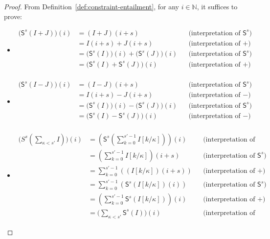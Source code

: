 \begin{proof}
From Definition~\ref{def:constraint-entailment}, for any $i \in \mathbb{N}$, it suffices to prove:
\begin{itemize}
  \item[(1)]
  \begin{align*}
    \bigl(\mathsf{S}^s(I+J)\bigr)(i)
    &= (I+J)(i+s)&& \text{(interpretation of $\mathsf{S}^{s}$)}\\
    &= I(i+s)+J(i+s)&& \text{(interpretation of $+$)}\\
    &= \bigl(\mathsf{S}^s(I)\bigr)(i)
       +\bigl(\mathsf{S}^s(J)\bigr)(i)&& \text{(interpretation of $\mathsf{S}^{s}$)}\\
    &= \bigl(\mathsf{S}^s(I)+\mathsf{S}^s(J)\bigr)(i) && \text{(interpretation of $+$)}\\
  \end{align*}

  \item[(2)]
  \begin{align*}
    \bigl(\mathsf{S}^s(I-J)\bigr)(i)
    &= (I-J)(i+s)
       && \text{(interpretation of $\mathsf{S}^{s}$)}\\
    &= I(i+s)-J(i+s) && \text{(interpretation of $\mathsf{-}$)}\\
    &= \bigl(\mathsf{S}^s(I)\bigr)(i) -\bigl(\mathsf{S}^s(J)\bigr)(i)
      && \text{(interpretation of $\mathsf{S}^{s}$)}\\
    &= \bigl(\mathsf{S}^s(I)-\mathsf{S}^s(J)\bigr)(i) 
      && \text{(interpretation of $\mathsf{-}$)}\\
  \end{align*}

  \item[(3)]
  \begin{align*}
    \mathsf({S}^{s}(\sum_{\kappa<s'}I))(i)
    &= (\mathsf{S}^{s}(\sum_{k=0}^{s'-1}I[k/\kappa]))(i)
      && \text{(interpretation of bounded sum)}\\
    &= (\sum_{k=0}^{s'-1}I[k/\kappa])(i+s) && \text{(interpretation of $\mathsf{S}^{s}$)}\\
    &= \sum_{k=0}^{s'-1}((I[k/\kappa])(i+s)) && \text{(interpretation of $+$)}\\
    &= \sum_{k=0}^{s'-1}(\mathsf{S}^s(I[k/\kappa])(i)) && \text{(interpretation of $\mathsf{S}^{s}$)}\\
    &= (\sum_{k=0}^{s'-1}\mathsf{S}^s(I[k/\kappa]))(i) && \text{(interpretation of $+$)}\\
    &= \bigl(\textstyle\sum_{\kappa<s'}\mathsf{S}^s(I)\bigr)(i)
       && \text{(interpretation of bounded sum)}
  \end{align*}
\end{itemize}
\end{proof}


